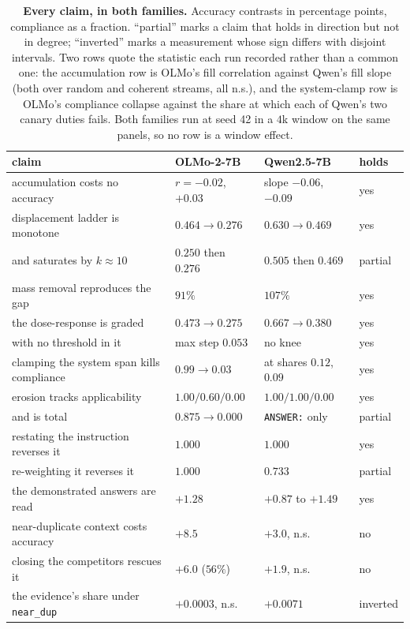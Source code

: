 \documentclass{article}
\begin{document}
\begin{table}[H]
  \centering\small
  \caption{\textbf{Every claim, in both families.} Accuracy contrasts in percentage points,
  compliance as a fraction. ``partial'' marks a claim that holds in direction but not in
  degree; ``inverted'' marks a measurement whose sign differs with disjoint intervals. Two
  rows quote the statistic each run recorded rather than a common one: the accumulation row is
  OLMo's fill correlation against Qwen's fill slope (both over random and coherent streams,
  all n.s.), and the system-clamp row is OLMo's compliance collapse against the share at which
  each of Qwen's two canary duties fails. Both families run at seed 42 in a $4$k window on the
  same panels, so no row is a window effect.}
  \label{tab:crossfamily}
  \setlength{\tabcolsep}{4pt}
  \begin{tabular}{@{}l l l l@{}}
    \toprule
    claim & OLMo-2-7B & Qwen2.5-7B & holds\\
    \midrule
    accumulation costs no accuracy & $r=-0.02$, $+0.03$ & slope $-0.06$, $-0.09$ & yes\\
    displacement ladder is monotone & $0.464\to0.276$ & $0.630\to0.469$ & yes\\
    \quad and saturates by $k{\approx}10$ & $0.250$ then $0.276$ & $0.505$ then $0.469$ & partial\\
    mass removal reproduces the gap & $91\%$ & $107\%$ & yes\\
    the dose-response is graded & $0.473\to0.275$ & $0.667\to0.380$ & yes\\
    \quad with no threshold in it & max step $0.053$ & no knee & yes\\
    clamping the system span kills compliance & $0.99\to0.03$ & at shares $0.12$, $0.09$ & yes\\
    erosion tracks applicability & $1.00/0.60/0.00$ & $1.00/1.00/0.00$ & yes\\
    \quad and is total & $0.875\to0.000$ & \texttt{ANSWER:} only & partial\\
    restating the instruction reverses it & $1.000$ & $1.000$ & yes\\
    re-weighting it reverses it & $1.000$ & $0.733$ & partial\\
    the demonstrated answers are read & $+1.28$ & $+0.87$ to $+1.49$ & yes\\
    \midrule
    near-duplicate context costs accuracy & $+8.5$ & $+3.0$, n.s. & no\\
    closing the competitors rescues it & $+6.0$ ($56\%$) & $+1.9$, n.s. & no\\
    the evidence's share under \texttt{near\_dup} & $+0.0003$, n.s. & $+0.0071$ & inverted\\
    \bottomrule
  \end{tabular}
\end{table}
\end{document}
